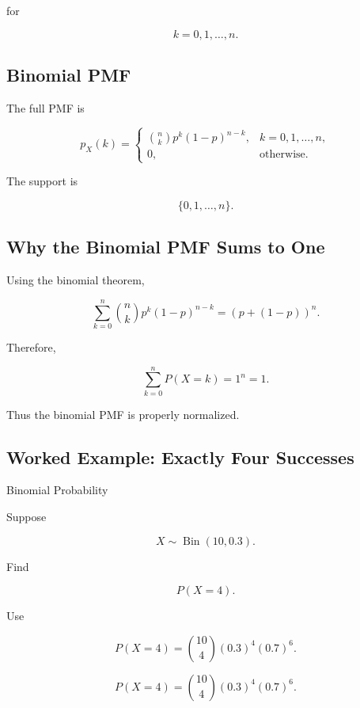 for

\[
k=0,1,\ldots,n.
\]

\subsection{Binomial PMF}
\label{subsec:binomial-pmf}

The full PMF is

\[
\boxed{
p_X(k)
=
\begin{cases}
\displaystyle
\binom nk
p^k(1-p)^{n-k},
&
k=0,1,\ldots,n,
\\[3mm]
0,
&
\text{otherwise}.
\end{cases}
}
\]

The support is

\[
\boxed{
\{0,1,\ldots,n\}.
}
\]

\subsection{Why the Binomial PMF Sums to One}
\label{subsec:binomial-normalization}

Using the binomial theorem,

\[
\sum_{k=0}^{n}
\binom nk
p^k(1-p)^{n-k}
=
(p+(1-p))^n.
\]

Therefore,

\[
\boxed{
\sum_{k=0}^{n}
P(X=k)
=
1^n
=
1.
}
\]

Thus the binomial PMF is properly normalized.

\subsection{Worked Example: Exactly Four Successes}
\label{subsec:worked-binomial-four-successes}

\begin{workedexamplebox}{Binomial Probability}

Suppose

\[
X\sim\operatorname{Bin}(10,0.3).
\]

Find

\[
P(X=4).
\]

Use

\[
P(X=4)
=
\binom{10}{4}
(0.3)^4
(0.7)^6.
\]

\begin{answerbox}
\[
\boxed{
P(X=4)
=
\binom{10}{4}
(0.3)^4
(0.7)^6.
}
\]
\end{answerbox}

\end{workedexamplebox}


